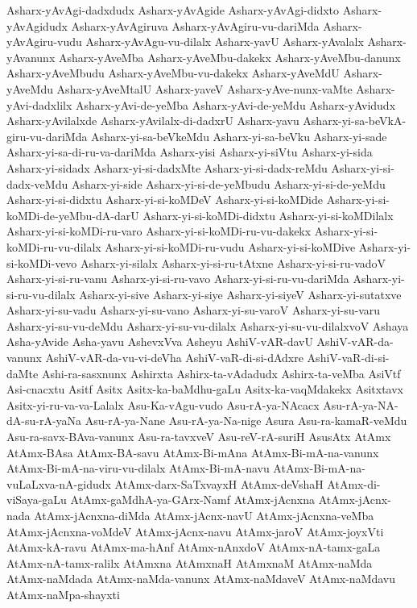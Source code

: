 {Asharx-yAvAgi-dadxdudx
Asharx-yAvAgide
Asharx-yAvAgi-didxto
Asharx-yAvAgidudx
Asharx-yAvAgiruva
Asharx-yAvAgiru-vu-dariMda
Asharx-yAvAgiru-vudu
Asharx-yAvAgu-vu-dilalx
Asharx-yavU
Asharx-yAvalalx
Asharx-yAvanunx
Asharx-yAveMba
Asharx-yAveMbu-dakekx
Asharx-yAveMbu-danunx
Asharx-yAveMbudu
Asharx-yAveMbu-vu-dakekx
Asharx-yAveMdU
Asharx-yAveMdu
Asharx-yAveMtalU
Asharx-yaveV
Asharx-yAve-nunx-vaMte
Asharx-yAvi-dadxlilx
Asharx-yAvi-de-yeMba
Asharx-yAvi-de-yeMdu
Asharx-yAvidudx
Asharx-yAvilalxde
Asharx-yAvilalx-di-dadxrU
Asharx-yavu
Asharx-yi-sa-beVkA-giru-vu-dariMda
Asharx-yi-sa-beVkeMdu
Asharx-yi-sa-beVku
Asharx-yi-sade
Asharx-yi-sa-di-ru-va-dariMda
Asharx-yisi
Asharx-yi-siVtu
Asharx-yi-sida
Asharx-yi-sidadx
Asharx-yi-si-dadxMte
Asharx-yi-si-dadx-reMdu
Asharx-yi-si-dadx-veMdu
Asharx-yi-side
Asharx-yi-si-de-yeMbudu
Asharx-yi-si-de-yeMdu
Asharx-yi-si-didxtu
Asharx-yi-si-koMDeV
Asharx-yi-si-koMDide
Asharx-yi-si-koMDi-de-yeMbu-dA-darU
Asharx-yi-si-koMDi-didxtu
Asharx-yi-si-koMDilalx
Asharx-yi-si-koMDi-ru-varo
Asharx-yi-si-koMDi-ru-vu-dakekx
Asharx-yi-si-koMDi-ru-vu-dilalx
Asharx-yi-si-koMDi-ru-vudu
Asharx-yi-si-koMDive
Asharx-yi-si-koMDi-vevo
Asharx-yi-silalx
Asharx-yi-si-ru-tAtxne
Asharx-yi-si-ru-vadoV
Asharx-yi-si-ru-vanu
Asharx-yi-si-ru-vavo
Asharx-yi-si-ru-vu-dariMda
Asharx-yi-si-ru-vu-dilalx
Asharx-yi-sive
Asharx-yi-siye
Asharx-yi-siyeV
Asharx-yi-sutatxve
Asharx-yi-su-vadu
Asharx-yi-su-vano
Asharx-yi-su-varoV
Asharx-yi-su-varu
Asharx-yi-su-vu-deMdu
Asharx-yi-su-vu-dilalx
Asharx-yi-su-vu-dilalxvoV
Ashaya
Asha-yAvide
Asha-yavu
AshevxVva
Asheyu
AshiV-vAR-davU
AshiV-vAR-da-vanunx
AshiV-vAR-da-vu-vi-deVha
AshiV-vaR-di-si-dAdxre
AshiV-vaR-di-si-daMte
Ashi-ra-sasxnunx
Ashirxta
Ashirx-ta-vAdadudx
Ashirx-ta-veMba
AsiVtf
Asi-cnacxtu
Asitf
Asitx
Asitx-ka-baMdhu-gaLu
Asitx-ka-vaqMdakekx
Asitxtavx
Asitx-yi-ru-va-va-Lalalx
Asu-Ka-vAgu-vudo
Asu-rA-ya-NAcacx
Asu-rA-ya-NA-dA-su-rA-yaNa
Asu-rA-ya-Nane
Asu-rA-ya-Na-nige
Asura
Asu-ra-kamaR-veMdu
Asu-ra-savx-BAva-vanunx
Asu-ra-tavxveV
Asu-reV-rA-suriH
AsusAtx
AtAmx
AtAmx-BAsa
AtAmx-BA-savu
AtAmx-Bi-mAna
AtAmx-Bi-mA-na-vanunx
AtAmx-Bi-mA-na-viru-vu-dilalx
AtAmx-Bi-mA-navu
AtAmx-Bi-mA-na-vuLaLxva-nA-gidudx
AtAmx-darx-SaTxvayxH
AtAmx-deVshaH
AtAmx-di-viSaya-gaLu
AtAmx-gaMdhA-ya-GArx-Namf
AtAmx-jAcnxna
AtAmx-jAcnx-nada
AtAmx-jAcnxna-diMda
AtAmx-jAcnx-navU
AtAmx-jAcnxna-veMba
AtAmx-jAcnxna-voMdeV
AtAmx-jAcnx-navu
AtAmx-jaroV
AtAmx-joyxVti
AtAmx-kA-ravu
AtAmx-ma-hAnf
AtAmx-nAnxdoV
AtAmx-nA-tamx-gaLa
AtAmx-nA-tamx-ralilx
AtAmxna
AtAmxnaH
AtAmxnaM
AtAmx-naMda
AtAmx-naMdada
AtAmx-naMda-vanunx
AtAmx-naMdaveV
AtAmx-naMdavu
AtAmx-naMpa-shayxti
}

